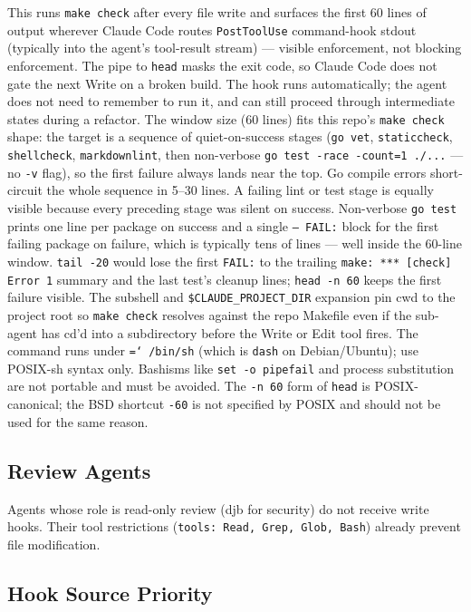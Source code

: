\documentclass[a4paper,10pt]{article}
\newcommand{\fpath}[1]{\texttt{\hyphenchar\font=`\/ #1}}
\newcommand{\field}[1]{\texttt{#1}}
\newcommand{\cmd}[1]{\texttt{#1}}
\begin{document}
This runs \cmd{make check} after every file write and surfaces
the first 60 lines of output wherever Claude Code routes
\field{PostToolUse} command-hook stdout (typically into the
agent's tool-result stream) --- visible enforcement, not blocking
enforcement. The pipe to \cmd{head} masks the exit code, so
Claude Code does not gate the next Write on a broken build. The
hook runs automatically; the agent does not need to remember to
run it, and can still proceed through intermediate states during
a refactor. The window size (60 lines) fits this repo's
\cmd{make check} shape: the target is a sequence of
quiet-on-success stages (\cmd{go vet}, \cmd{staticcheck},
\cmd{shellcheck}, \cmd{markdownlint}, then non-verbose
\cmd{go test -race -count=1 ./...} --- no \cmd{-v} flag), so the
first failure always lands near the top. Go compile errors
short-circuit the whole sequence in 5--30 lines. A failing lint
or test stage is equally visible because every preceding stage
was silent on success. Non-verbose \cmd{go test} prints one line
per package on success and a single \texttt{--- FAIL:} block for
the first failing package on failure, which is typically tens of
lines --- well inside the 60-line window. \cmd{tail -20} would
lose the first \texttt{FAIL:} to the trailing
\cmd{make: *** [check] Error 1} summary and the last test's
cleanup lines; \cmd{head -n 60} keeps the first failure
visible. The subshell and \field{\$CLAUDE\_PROJECT\_DIR}
expansion pin cwd to the project root so \cmd{make check}
resolves against the repo Makefile even if the sub-agent has
cd'd into a subdirectory before the Write or Edit tool fires.
The command runs under \fpath{/bin/sh} (which is \cmd{dash} on
Debian/Ubuntu); use POSIX-sh syntax only. Bashisms like
\cmd{set -o pipefail} and process substitution are not portable
and must be avoided. The \cmd{-n 60} form of \cmd{head} is
POSIX-canonical; the BSD shortcut \cmd{-60} is not specified by
POSIX and should not be used for the same reason.

\subsection{Review Agents}

Agents whose role is read-only review (djb for security) do not
receive write hooks. Their tool restrictions
(\field{tools: Read, Grep, Glob, Bash}) already prevent file
modification.

\subsection{Hook Source Priority}
\end{document}

